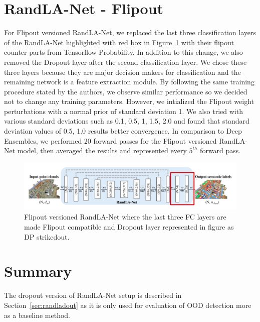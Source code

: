     \section{RandLA-Net - Flipout}
    For Flipout versioned RandLA-Net, we replaced the last three classification layers of the RandLA-Net highlighted with red box in Figure~\ref{fig:fout_randlanet} with their flipout counter parts from Tensorflow Probability.
    In addition to this change, we also removed the Dropout layer after the second classification layer.
    We chose these three layers because they are major decision makers for classification and the remaining network is a feature extraction module.
    By following the same training procedure stated by the authors, we observe similar performance so we decided not to change any training parameters.
    However, we intialized the Flipout weight perturbations with a normal prior of standard deviation 1.
    We also tried with various standard deviations such as 0.1, 0.5, 1, 1.5, 2.0 and found that standard deviation values of 0.5, 1.0 results better convergence.
    In comparison to Deep Ensembles, we performed 20 forward passes for the Flipout versioned RandLA-Net model, then averaged the results and represented every $5^{th}$ forward pass.
    \begin{figure}
        \centering
        \includegraphics[scale=0.42]{images/fout_randlanet.png}
        \caption{Flipout versioned RandLA-Net where the last three FC layers are made Flipout compatible and Dropout layer represented in figure as DP strikedout.}
        \label{fig:fout_randlanet}
    \end{figure}

    \section{Summary}
    The dropout version of RandLA-Net setup is described in Section~\ref{sec:randladout} as it is only used for evaluation of OOD detection more as a baseline method.

